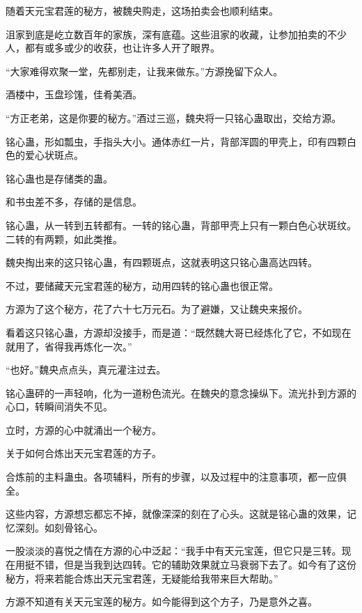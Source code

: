 
\begin{this_body}



随着天元宝君莲的秘方，被魏央购走，这场拍卖会也顺利结束。

沮家到底是屹立数百年的家族，深有底蕴。这些沮家的收藏，让参加拍卖的不少人，都有或多或少的收获，也让许多人开了眼界。

“大家难得欢聚一堂，先都别走，让我来做东。”方源挽留下众人。

酒楼中，玉盘珍馐，佳肴美酒。

“方正老弟，这是你要的秘方。”酒过三巡，魏央将一只铭心蛊取出，交给方源。

铭心蛊，形如瓢虫，手指头大小。通体赤红一片，背部浑圆的甲壳上，印有四颗白色的爱心状斑点。

铭心蛊也是存储类的蛊。

和书虫差不多，存储的是信息。

铭心蛊，从一转到五转都有。一转的铭心蛊，背部甲壳上只有一颗白色心状斑纹。二转的有两颗，如此类推。

魏央掏出来的这只铭心蛊，有四颗斑点，这就表明这只铭心蛊高达四转。

不过，要储藏天元宝君莲的秘方，动用四转的铭心蛊也很正常。

方源为了这个秘方，花了六十七万元石。为了避嫌，又让魏央来报价。

看着这只铭心蛊，方源却没接手，而是道：“既然魏大哥已经炼化了它，不如现在就用了，省得我再炼化一次。”

“也好。”魏央点点头，真元灌注过去。

铭心蛊砰的一声轻响，化为一道粉色流光。在魏央的意念操纵下。流光扑到方源的心口，转瞬间消失不见。

立时，方源的心中就涌出一个秘方。

关于如何合炼出天元宝君莲的方子。

合炼前的主料蛊虫。各项辅料，所有的步骤，以及过程中的注意事项，都一应俱全。

这些内容，方源想忘都忘不掉，就像深深的刻在了心头。这就是铭心蛊的效果，记忆深刻。如刻骨铭心。

一股淡淡的喜悦之情在方源的心中泛起：“我手中有天元宝莲，但它只是三转。现在用挺不错，但是当我到达四转。它的辅助效果就立马衰弱下去了。如今有了这份秘方，将来若能合炼出天元宝君莲，无疑能给我带来巨大帮助。”

方源不知道有关天元宝莲的秘方。如今能得到这个方子，乃是意外之喜。


\end{this_body}
